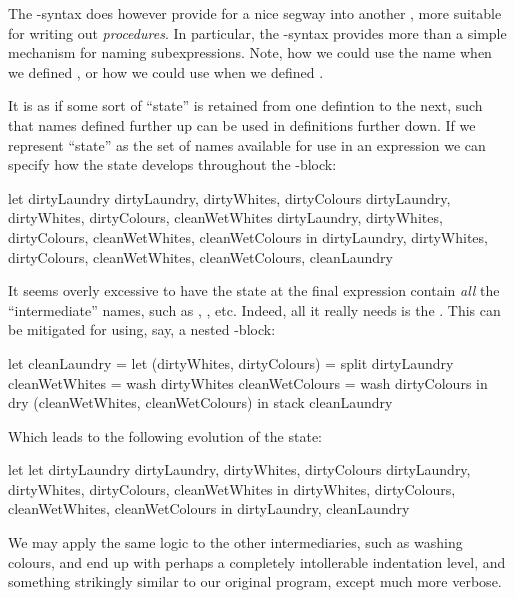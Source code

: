 The -syntax does however provide for a nice segway into another
, more suitable for writing out \emph{procedures}. In particular, the
-syntax provides more than a simple mechanism for naming
subexpressions. Note, how we could use the name  when we
defined , or how we could use  when we
defined .

It is as if some sort of ``state'' is retained from one defintion to the next,
such that names defined further up can be used in definitions further down. If
we represent ``state'' as the set of names available for use in an expression
we can specify how the state develops throughout the -block: 

\begin{code}
let
  {dirtyLaundry}
  {dirtyLaundry, dirtyWhites, dirtyColours}
  {dirtyLaundry, dirtyWhites, dirtyColours,
    cleanWetWhites}
  {dirtyLaundry, dirtyWhites, dirtyColours,
    cleanWetWhites, cleanWetColours}
in
  {dirtyLaundry, dirtyWhites, dirtyColours,
    cleanWetWhites, cleanWetColours, cleanLaundry}
\end{code}

It seems overly excessive to have the state at the final expression contain
\emph{all} the ``intermediate'' names, such as ,
, etc. Indeed, all it really needs is the
. This can be mitigated for using, say, a nested
-block:

\begin{code}
let
  cleanLaundry =
    let
      (dirtyWhites, dirtyColours) = split dirtyLaundry
      cleanWetWhites = wash dirtyWhites
      cleanWetColours = wash dirtyColours
    in
      dry (cleanWetWhites, cleanWetColours)
in
  stack cleanLaundry
\end{code}

Which leads to the following evolution of the state:

\begin{code}
let
  let
    {dirtyLaundry}
    {dirtyLaundry, dirtyWhites, dirtyColours}
    {dirtyLaundry, dirtyWhites, dirtyColours,
      cleanWetWhites}
  in
    {dirtyWhites, dirtyColours, cleanWetWhites,
      cleanWetColours}
in
  {dirtyLaundry, cleanLaundry}
\end{code}

We may apply the same logic to the other intermediaries, such as washing
colours, and end up with perhaps a completely intollerable indentation level,
and something strikingly similar to our original program, except much more
verbose.

